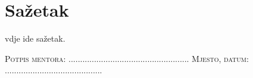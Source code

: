 \chapter*{Sažetak}
\begin{SingleSpace}
vdje ide sažetak.


\vspace{10cm}
\noindent
\hspace{-0.75cm}\textsc{Potpis mentora: .................................................... Mjesto, datum: ..........................................}
\end{SingleSpace}
\clearpage